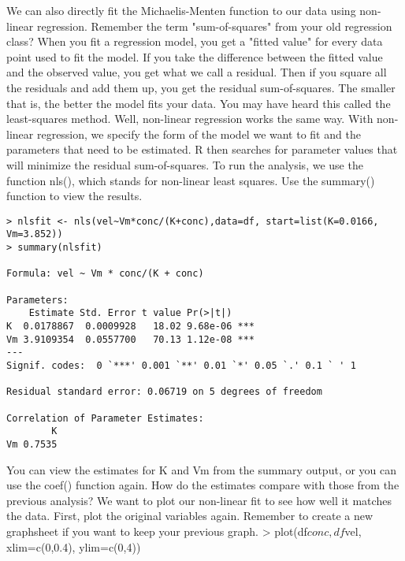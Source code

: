 {We can also directly fit the Michaelis-Menten function to our data using non-linear regression. Remember the term "sum-of-squares" from your old regression class? When you fit a regression model, you get a "fitted value" for every data point used to fit the model. If you take the difference between the fitted value and the observed value, you get what we call a residual. Then if you square all the residuals and add them up, you get the residual sum-of-squares. The smaller that is, the better the model fits your data. You may have heard this called the least-squares method. Well, non-linear regression works the same way. With non-linear regression, we specify the form of the model we want to fit and the parameters that need to be estimated. R then searches for parameter values that will minimize the residual sum-of-squares. 
To run the analysis, we use the function nls(), which stands for non-linear least squares. Use the summary() function to view the results. 
\begin{framed}
\begin{verbatim}
> nlsfit <- nls(vel~Vm*conc/(K+conc),data=df, start=list(K=0.0166, Vm=3.852))
> summary(nlsfit)

Formula: vel ~ Vm * conc/(K + conc)

Parameters:
    Estimate Std. Error t value Pr(>|t|)    
K  0.0178867  0.0009928   18.02 9.68e-06 ***
Vm 3.9109354  0.0557700   70.13 1.12e-08 ***
---
Signif. codes:  0 `***' 0.001 `**' 0.01 `*' 0.05 `.' 0.1 ` ' 1 

Residual standard error: 0.06719 on 5 degrees of freedom

Correlation of Parameter Estimates:
        K
Vm 0.7535 
\end{verbatim}
\end{framed}

You can view the estimates for K and Vm from the summary output, or you can use the coef() function again. How do the estimates compare with those from the previous analysis? We want to plot our non-linear fit to see how well it matches the data. First, plot the original variables again. Remember to create a new graphsheet if you want to keep your previous graph. 
> plot(df$conc, df$vel, xlim=c(0,0.4), ylim=c(0,4))


}
